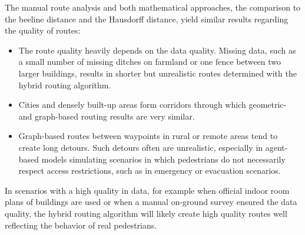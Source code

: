 			The manual route analysis and both mathematical approaches, the comparison to the beeline distance and the Hausdorff distance, yield similar results regarding the quality of routes:
			
			\begin{itemize}
				\item The route quality heavily depends on the data quality.
				Missing data, such as a small number of missing ditches on farmland or one fence between two larger buildings, results in shorter but unrealistic routes determined with the hybrid routing algorithm.
				\item Cities and densely built-up areas form corridors through which geometric- and graph-based routing results are very similar.
				\item Graph-based routes between waypoints in rural or remote areas tend to create long detours.
				Such detours often are unrealistic, especially in agent-based models simulating scenarios in which pedestrians do not necessarily respect access restrictions, such as in emergency or evacuation scenarios.
			\end{itemize}
			\noindent
			In scenarios with a high quality in data, for example when official indoor room plans of buildings are used or when a manual on-ground survey ensured the data quality, the hybrid routing algorithm will likely create high quality routes well reflecting the behavior of real pedestrians.
